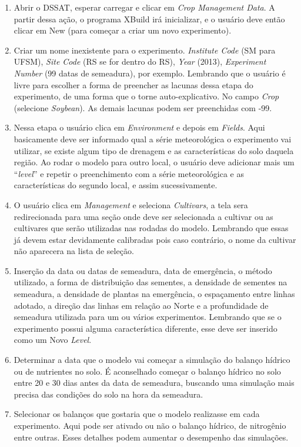 \documentclass[tg]{mdtufsm}
\begin{document}
	\begin{enumerate}
		\item  Abrir o DSSAT, esperar carregar e clicar em \emph{Crop Management Data}. A partir dessa ação, o programa XBuild irá inicializar, e o usuário deve então clicar em New (para começar a criar um novo experimento).
		\item  Criar um nome inexistente para o experimento. \emph{Institute Code} (SM para UFSM), \emph{Site Code} (RS se for dentro do RS), \emph{Year} (2013), \emph{Experiment Number} (99 datas de semeadura), por exemplo. Lembrando que o usuário é livre para escolher a forma de preencher as lacunas dessa etapa do experimento, de uma forma que o torne auto-explicativo. No campo \emph{Crop} (selecione \emph{Soybean}). As demais lacunas podem ser preenchidas com -99.
		\item Nessa etapa o usuário clica em \emph{Environment} e depois em \emph{Fields}. Aqui basicamente deve ser informado qual a série meteorológica o experimento vai utilizar, se existe algum tipo de drenagem e as características do solo daquela região. Ao rodar o modelo para outro local, o usuário deve adicionar mais um “\emph{level}” e repetir o preenchimento com a série meteorológica e as características do segundo local, e assim sucessivamente.
		\item O usuário clica em \emph{Management} e seleciona \emph{Cultivars}, a tela sera redirecionada para uma seção onde deve ser selecionada a cultivar ou as cultivares que serão utilizadas nas rodadas do modelo. Lembrando que essas já devem estar devidamente calibradas pois caso contrário, o nome da cultivar não aparecera na lista de seleção.
		\item Inserção da data ou datas de semeadura, data de emergência, o método utilizado, a forma de distribuição das sementes, a densidade de sementes na semeadura, a densidade de plantas na emergência, o espaçamento entre linhas adotado, a direção das linhas em relação ao Norte e a profundidade de semeadura utilizada para um ou vários experimentos. Lembrando que se o experimento possui alguma característica diferente, esse deve ser inserido como um Novo \emph{Level}.
		\item Determinar a data que o modelo vai começar a simulação do balanço hídrico ou de nutrientes no solo. É aconselhado começar o balanço hídrico no solo entre 20 e 30 dias antes da data de semeadura, buscando uma simulação mais precisa das condições do solo na hora da semeadura.
		\item Selecionar os balanços que gostaria que o modelo realizasse em cada experimento. Aqui pode ser ativado ou não o balanço hídrico, de nitrogênio entre outras. Esses detalhes podem aumentar o desempenho das simulações.

\end{enumerate}
\end{document}
